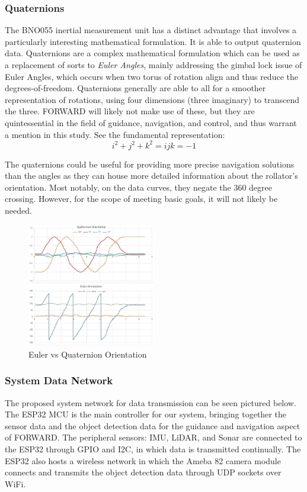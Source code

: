 \subsubsection{Quaternions}
\noindent The BNO055 inertial measurement unit has a distinct advantage that involves a particularly interesting mathematical formulation. It is able to output quaternion data. Quaternions are a complex mathematical formulation which can be used as a replacement of sorts to \textit{Euler Angles}, mainly addressing the gimbal lock issue of Euler Angles, which occurs when two torus of rotation align and thus reduce the degrees-of-freedom. Quaternions generally are able to all for a smoother representation of rotations, using four dimensions (three imaginary) to transcend the three. \cite{quat} FORWARD will likely not make use of these, but they are quintessential in the field of guidance, navigation, and control, and thus warrant a mention in this study. See the fundamental representation:\\
$$i^2+j^2+k^2=ijk=-1$$

\noindent The quaternions could be useful for providing more precise navigation solutions than the angles as they can house more detailed information about the rollator's orientation. Most notably, on the data curves, they negate the 360 degree crossing. However, for the scope of meeting basic goals, it will not likely be needed.

\begin{figure}[H]
	\centering
	\includegraphics[width=0.5\textwidth]{./Images/euler-quat.JPG}
	\caption{\label{fig:euler-quat}Euler vs Quaternion Orientation \cite{euler-quat}}
\end{figure}

\subsubsection{System Data Network}
\noindent The proposed system network for data transmission can be seen pictured below. The ESP32 MCU is the main controller for our system, bringing together the sensor data and the object detection data for the guidance and navigation aspect of FORWARD. The peripheral sensors: IMU, LiDAR, and Sonar are connected to the ESP32 through GPIO and I2C, in which data is transmitted continually. The ESP32 also hosts a wireless network in which the Ameba 82 camera module connects and transmits the object detection data through UDP sockets over WiFi. \\

